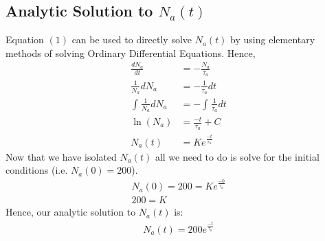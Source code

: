 \documentclass[twocolumn]{article}
\begin{document}
\subsection{Analytic Solution to $N_a(t)$}
\hspace{\parindent} Equation $(1)$ can be used to directly solve $N_a(t)$ by using elementary methods of solving Ordinary Differential Equations. Hence,
	\begin{align}
	\frac{dN_a}{dt}&=-\frac{N_a}{\tau_a}\\
	\frac{1}{N_a}dN_a&=-\frac{1}{\tau_a}dt\\
	\int_{}{}\frac{1}{N_a}dN_a&=-\int_{}{}\frac{1}{\tau_a}dt\\
	\ln(N_a)&=\frac{-t}{\tau_a}+C\\
	N_a(t)&=Ke^{\frac{-t}{\tau_a}}
	\end{align}
Now that we have isolated $N_a(t)$ all we need to do is solve for the initial conditions (i.e. $N_a(0)=200$).
	\begin{align}
	N_a(0)=200=Ke^{\frac{-0}{\tau_a}}\\
	200=K
	\end{align}
Hence, our analytic solution to $N_a(t)$ is:
	\begin{align}
	N_a(t)=200e^{\frac{-t}{\tau_a}}
	\end{align}
\end{document}
